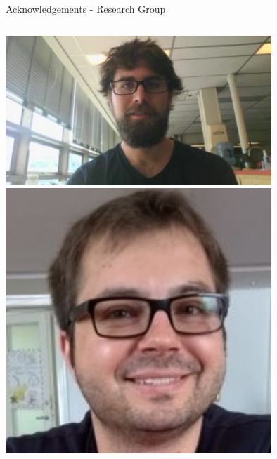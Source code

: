 \documentclass[aspectratio=169]{beamer}
\begin{document}
\begin{frame}{Acknowledgements - Research Group}
\begin{columns}
            \includegraphics[width=0.75\textwidth]{people/actual_mrg/patrick.png}
            \includegraphics[width=0.75\textwidth]{people/actual_mrg/ivica.png}
            

\end{columns}
\end{frame}
\end{document}
